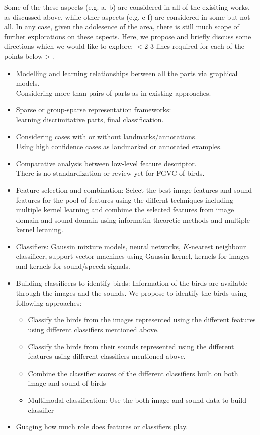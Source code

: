 \documentclass{article}
\begin{document}
Some of the these aspects (e.g. a, b) are considered  in all of the exisiting works, as discussed above, while other aspects (e.g. c-f)  are considered in some but not all. In any case, given the adolesence of the area, there is still much scope of further explorations on these aspects. Here, we propose and briefly discuss some directions which we would like to explore: $<$2-3 lines required for each of the points below$>$.
\begin{itemize}
\item Modelling and learning relationships between all the parts via graphical models.\\ Considering more than pairs of parts as in existing approaches. %
\item Sparse or group-sparse representation frameworks:\\ learning discrimitative parts, final classification.
\item Considering cases with or without landmarks/annotations. \\Using high confidence cases as landmarked or annotated examples.
\item Comparative analysis between low-level feature descriptor.\\ There is no standardization or review yet for FGVC of birds.
\item Feature selection and combination: Select the best image features and sound features for the pool of features using the differnt techniques including multiple kernel learning and combime the selected features from image domain and sound domain using informatin theoretic methods and multiple kernel leraning. 
\item Classifiers: Gaussin mixture models, neural networks, $K$-nearest neighbour classifieer, support vector machines using Gaussin kernel, kernels for images and kernels for sound/speech signals. 
\item Building classifieers to identify birds: Information of the birds are available through the images and the sounds. We propose to identify the birds using following approaches:
\begin{itemize}
    \item Classify the birds from the images represented using the different features using different classifiers mentioned above.  
    \item Classify the birds from their sounds represented using the different features using different classifiers mentioned above. 
    \item Combine the classifier scores of the different classifiers built on both image and sound of birds
    \item Multimodal classification:  Use the both image and sound data to build classifier
\end{itemize}
\item Guaging how much role does features or classifiers play.
\end{itemize}
\end{document}

